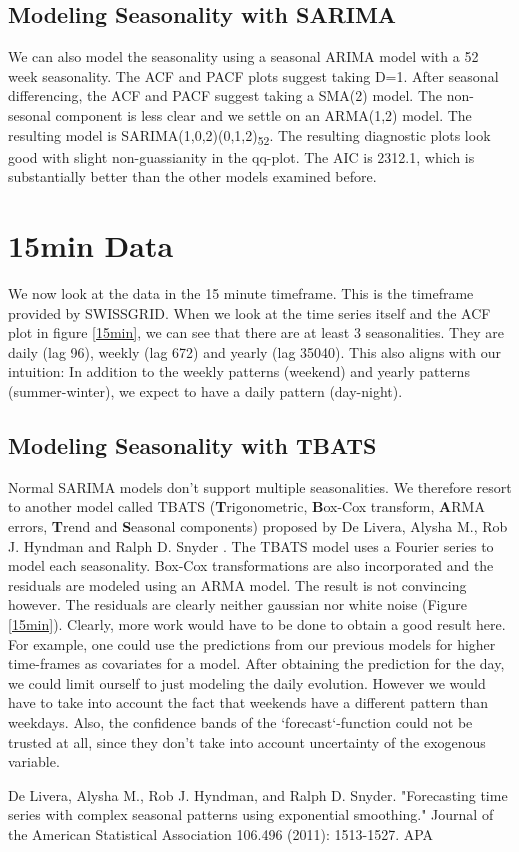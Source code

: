 \documentclass[conference]{IEEEtran}
\begin{document}
\subsection{Modeling Seasonality with SARIMA}
We can also model the seasonality using a seasonal ARIMA model with a 52 week seasonality. The ACF and PACF plots suggest taking D=1. After seasonal differencing, the ACF and PACF suggest taking a SMA(2) model. The non-sesonal component is less clear and we settle on an ARMA(1,2) model. The resulting model is SARIMA(1,0,2)(0,1,2)\textsubscript{52}. The resulting diagnostic plots look good with slight non-guassianity in the qq-plot. The AIC is 2312.1, which is substantially better than the other models examined before.

\section{15min Data}
We now look at the data in the 15 minute timeframe. This is the timeframe provided by SWISSGRID. When we look at the time series itself and the ACF plot in figure \ref{15min}, we can see that there are at least 3 seasonalities. They are daily (lag 96), weekly (lag 672) and yearly (lag 35040). This also aligns with our intuition: In addition to the weekly patterns (weekend) and yearly patterns (summer-winter), we expect to have a daily pattern (day-night).
\subsection{Modeling Seasonality with TBATS}
Normal SARIMA models don’t support multiple seasonalities. We therefore resort to another model called TBATS (\textbf{T}rigonometric, \textbf{B}ox-Cox transform, \textbf{A}RMA errors, \textbf{T}rend and \textbf{S}easonal components) proposed by De Livera, Alysha M., Rob J. Hyndman and Ralph D. Snyder \cite{TBATS_paper}. The TBATS model uses a Fourier series to model each seasonality. Box-Cox transformations are also incorporated and the residuals are modeled using an ARMA model.
The result is not convincing however. The residuals are clearly neither gaussian nor white noise (Figure \ref{15min}). Clearly, more work would have to be done to obtain a good result here. For example, one could use the predictions from our previous models for higher time-frames as covariates for a model. After obtaining the prediction for the day, we could limit ourself to just modeling the daily evolution. However we would have to take into account the fact that weekends have a different pattern than weekdays. Also, the confidence bands  of the `forecast`-function could not be trusted at all, since they don’t take into account uncertainty of the exogenous variable.

\begin{thebibliography}{00}

De Livera, Alysha M., Rob J. Hyndman, and Ralph D. Snyder. "Forecasting time series with complex seasonal patterns using exponential smoothing." Journal of the American Statistical Association 106.496 (2011): 1513-1527.
APA	

\end{thebibliography}
\end{document}

